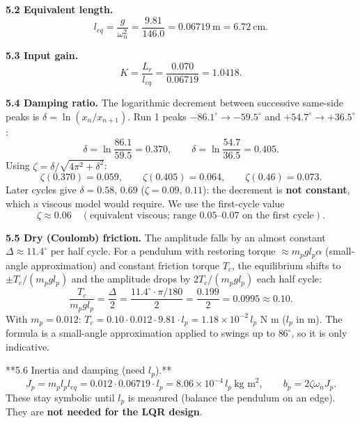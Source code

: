 \documentclass[11pt,a4paper]{article}
\begin{document}
\textbf{5.2 Equivalent length.}
\begin{equation*}
l_{eq}=\frac{g}{\omega_n^2}=\frac{9.81}{146.0}=0.06719\ \text{m}=6.72\ \text{cm}.
\end{equation*}

\textbf{5.3 Input gain.}
\begin{equation*}
K=\frac{L_r}{l_{eq}}=\frac{0.070}{0.06719}=1.0418 .
\end{equation*}

\textbf{5.4 Damping ratio.} The logarithmic decrement between successive same-side peaks is $\delta=\ln(x_n/x_{n+1})$. Run 1 peaks $-86.1^\circ\to-59.5^\circ$ and $+54.7^\circ\to+36.5^\circ$:
\begin{equation*}
\delta=\ln\frac{86.1}{59.5}=0.370,\qquad \delta=\ln\frac{54.7}{36.5}=0.405 .
\end{equation*}
Using $\zeta=\delta/\sqrt{4\pi^2+\delta^2}$:
\begin{equation*}
\zeta(0.370)=0.059,\qquad \zeta(0.405)=0.064,\qquad \zeta(0.46)=0.073 .
\end{equation*}
Later cycles give $\delta=0.58,\,0.69$ ($\zeta=0.09,\,0.11$): the decrement is \textbf{not constant}, which a viscous model would require. We use the first-cycle value
\begin{equation*}
\zeta\approx0.06\quad(\text{equivalent viscous; range }0.05\text{–}0.07\text{ on the first cycle}).
\end{equation*}

\textbf{5.5 Dry (Coulomb) friction.} The amplitude falls by an almost constant $\Delta\approx11.4^\circ$ per half cycle. For a pendulum with restoring torque $\approx m_pgl_p\alpha$ (small-angle approximation) and constant friction torque $T_c$, the equilibrium shifts to $\pm T_c/(m_pgl_p)$ and the amplitude drops by $2T_c/(m_pgl_p)$ each half cycle:
\begin{equation*}
\frac{T_c}{m_pgl_p}=\frac{\Delta}{2}=\frac{11.4^\circ\cdot\pi/180}{2}=\frac{0.199}{2}=0.0995\approx0.10 .
\end{equation*}
With $m_p=0.012$: $T_c=0.10\cdot0.012\cdot9.81\cdot l_p=1.18\times10^{-2}\,l_p$ N m ($l_p$ in m). The formula is a small-angle approximation applied to swings up to $86^\circ$, so it is only indicative.

**5.6 Inertia and damping (need $l_p$).**
\begin{equation*}
J_p=m_pl_pl_{eq}=0.012\cdot0.06719\cdot l_p=8.06\times10^{-4}\,l_p\ \text{kg m}^2,\qquad b_p=2\zeta\omega_nJ_p .
\end{equation*}
These stay symbolic until $l_p$ is measured (balance the pendulum on an edge). They are \textbf{not needed for the LQR design}.
\end{document}
